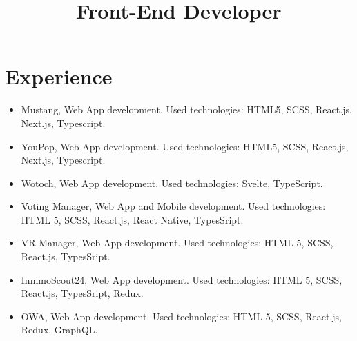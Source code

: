 \documentclass[11pt,a4paper]{moderncv}
\title{Front-End Developer}
\begin{document}
    \maketitle
    \section{Experience}

    {\begin{itemize}
         \item Mustang, Web App development. Used technologies: HTML5, SCSS, React.js, Next.js, Typescript.
         \item YouPop, Web App development. Used technologies: HTML5, SCSS, React.js, Next.js, Typescript.
    \end{itemize}
    }
    {\begin{itemize}
         \item Wotoch, Web App development. Used technologies: Svelte, TypeScript.
         \item Voting Manager, Web App and Mobile development. Used technologies: HTML 5, SCSS, React.js, React Native, TypesSript.
         \item VR Manager, Web App development. Used technologies: HTML 5, SCSS, React.js, TypesSript.
         \item InmmoScout24, Web App development. Used technologies: HTML 5, SCSS, React.js, TypesSript, Redux.
    \end{itemize}
    }
    {\begin{itemize}
         \item OWA, Web App development. Used technologies: HTML 5, SCSS, React.js, Redux, GraphQL.
    \end{itemize}
    }
\end{document}
